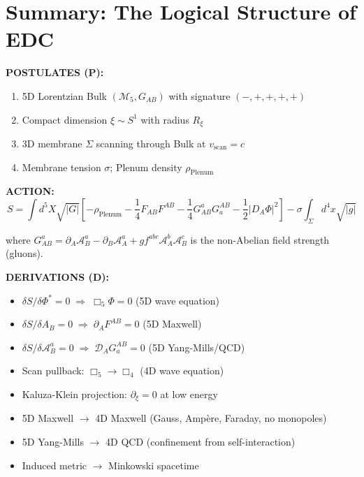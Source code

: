 \newpage

\section{Summary: The Logical Structure of EDC}
\label{sec:core_summary}

\begin{tcolorbox}[colback=blue!5,colframe=blue!70,title=EDC in One Page]

\textbf{POSTULATES (P):}
\begin{enumerate}
    \item 5D Lorentzian Bulk $(\mathcal{M}_5, G_{AB})$ with signature $(-,+,+,+,+)$
    \item Compact dimension $\xi \sim S^1$ with radius $R_\xi$
    \item 3D membrane $\Sigma$ scanning through Bulk at $v_{\text{scan}} = c$
    \item Membrane tension $\sigma$; Plenum density $\rho_{\text{Plenum}}$
\end{enumerate}

\textbf{ACTION:}
\begin{equation*}
S = \int d^5X\sqrt{|G|}\left[-\rho_{\text{Plenum}} - \frac{1}{4}F_{AB}F^{AB} - \frac{1}{4}G^a_{AB}G_a^{AB} - \frac{1}{2}|D_A\Phi|^2\right] - \sigma\int_\Sigma d^4x\sqrt{|g|}
\end{equation*}

where $G^a_{AB} = \partial_A \mathcal{A}^a_B - \partial_B \mathcal{A}^a_A + g f^{abc} \mathcal{A}^b_A \mathcal{A}^c_B$ is the non-Abelian field strength (gluons).

\textbf{DERIVATIONS (D):}
\begin{itemize}
    \item $\delta S/\delta\Phi^* = 0 \;\Rightarrow\; \Box_5\Phi = 0$ (5D wave equation)
    \item $\delta S/\delta A_B = 0 \;\Rightarrow\; \partial_A F^{AB} = 0$ (5D Maxwell)
    \item $\delta S/\delta \mathcal{A}^a_B = 0 \;\Rightarrow\; \mathcal{D}_A G^{AB}_a = 0$ (5D Yang-Mills/QCD)
    \item Scan pullback: $\Box_5 \to \Box_4$ (4D wave equation)
    \item Kaluza-Klein projection: $\partial_\xi = 0$ at low energy
    \item 5D Maxwell $\to$ 4D Maxwell (Gauss, Ampère, Faraday, no monopoles)
    \item 5D Yang-Mills $\to$ 4D QCD (confinement from self-interaction)
    \item Induced metric $\to$ Minkowski spacetime
\end{itemize}

\end{tcolorbox}

